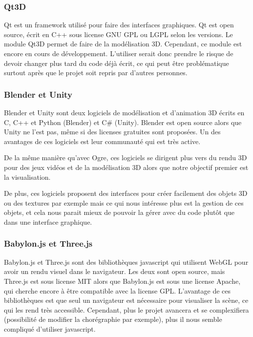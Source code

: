 \subsubsection{Qt3D}

Qt est un framework utilisé pour faire des interfaces graphiques. Qt est open source, écrit en C++ sous license GNU GPL ou LGPL selon les versions. Le module Qt3D permet de faire de la modélisation 3D. Cependant, ce module est encore en cours de développement. L'utiliser serait donc prendre le risque de devoir changer plus tard du code déjà écrit, ce qui peut être problématique surtout après que le projet soit repris par d'autres personnes. 

\subsubsection{Blender et Unity}

Blender et Unity sont deux logiciels de modélisation et d'animation 3D écrits en C, C++ et Python (Blender) et C\# (Unity). Blender est open source alors que Unity ne l'est pas, même si des licenses gratuites sont proposées. Un des avantages de ces logiciels est leur communauté qui est très active.

De la même manière qu'avec Ogre, ces logiciels se dirigent plus vers du rendu 3D pour des jeux vidéos et de la modélisation 3D alors que notre objectif premier est la visualisation. 

De plus, ces logiciels proposent des interfaces pour créer facilement des objets 3D ou des textures par exemple mais ce qui nous intéresse plus est la gestion de ces objets, et cela nous parait mieux de pouvoir la gérer avec du code plutôt que dans une interface graphique. 
				

\subsubsection{Babylon.js et Three.js}

Babylon.js et Three.js sont des bibliothèques javascript qui utilisent WebGL pour avoir un rendu visuel dans le navigateur. Les deux sont open source, mais Three.js est sous license MIT alors que Babylon.js est sous une license Apache, qui cherche encore à être compatible avec la license GPL. L'avantage de ces bibliothèques est que seul un navigateur est nécessaire pour visualiser la scène, ce qui les rend très accessible. Cependant, plus le projet avancera et se complexifiera (possibilité de modifier la chorégraphie par exemple), plus il nous semble compliqué d'utiliser javascript.






